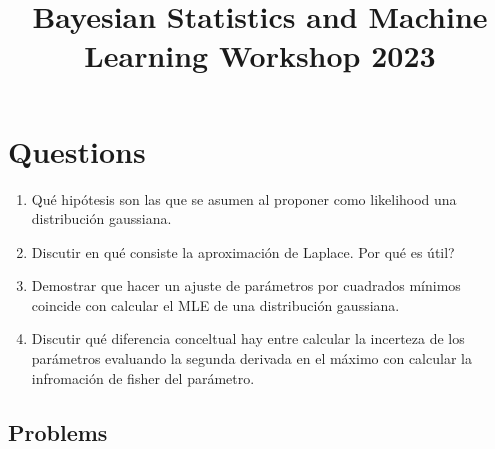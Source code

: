 \documentclass[12pt]{paper}
\title{\begin{center}Bayesian Statistics and Machine Learning Workshop 2023\end{center}}
\subtitle{\begin{center}\Large Aproximación Gaussiana y Teoría de ajustes\\ Martín Onetto \end{center}}
\begin{document}
\maketitle


\topmargin -2.0cm
\oddsidemargin -0.2cm
\evensidemargin -0.2cm

\vspace{-80pt}

\section{Questions}

\begin{enumerate}

\item Qué hipótesis son las que se asumen al proponer como likelihood una distribución gaussiana.
\item  Discutir en qué consiste la aproximación de Laplace. Por qué es útil?
\item Demostrar que hacer un ajuste de parámetros por cuadrados mínimos coincide con calcular el MLE de una distribución gaussiana.
\item Discutir qué diferencia conceltual hay entre calcular la incerteza de los parámetros evaluando la segunda derivada en el máximo con calcular la infromación de fisher del parámetro.
\end{enumerate}

\subsection{Problems}
\end{document}
